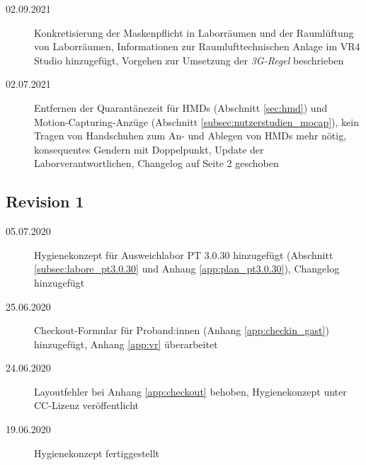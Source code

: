\documentclass[hidelinks,12pt]{extarticle}
\begin{document}
\begin{description}
    \item[02.09.2021] Konkretisierung der Maskenpflicht in Laborräumen und der Raumlüftung von Laborräumen, Informationen zur Raumlufttechnischen Anlage im VR4 Studio hinzugefügt, Vorgehen zur Umsetzung der \emph{3G-Regel} beschrieben
    \item[02.07.2021] Entfernen der Quarantänezeit für HMDs (Abschnitt \ref{sec:hmd}) und Motion-Capturing-Anzüge (Abschnitt \ref{subsec:nutzerstudien_mocap}), kein Tragen von Handschuhen zum An- und Ablegen von HMDs mehr nötig, konsequentes Gendern mit Doppelpunkt, Update der Laborverantwortlichen, Changelog auf Seite 2 geschoben
\end{description}

\subsection*{Revision 1}

\begin{description}
    \item[05.07.2020] Hygienekonzept für Ausweichlabor PT 3.0.30 hinzugefügt (Abschnitt \ref{subsec:labore_pt3.0.30} und Anhang \ref{app:plan_pt3.0.30}), Changelog hinzugefügt
    \item[25.06.2020] Checkout-Formular für Proband:innen (Anhang \ref{app:checkin_gast}) hinzugefügt, Anhang \ref{app:vr} überarbeitet
    \item[24.06.2020] Layoutfehler bei Anhang \ref{app:checkout} behoben, Hygienekonzept unter CC-Lizenz veröffentlicht
    \item[19.06.2020] Hygienekonzept fertiggestellt


\end{description}

\newpage
\tableofcontents 














\end{document}
